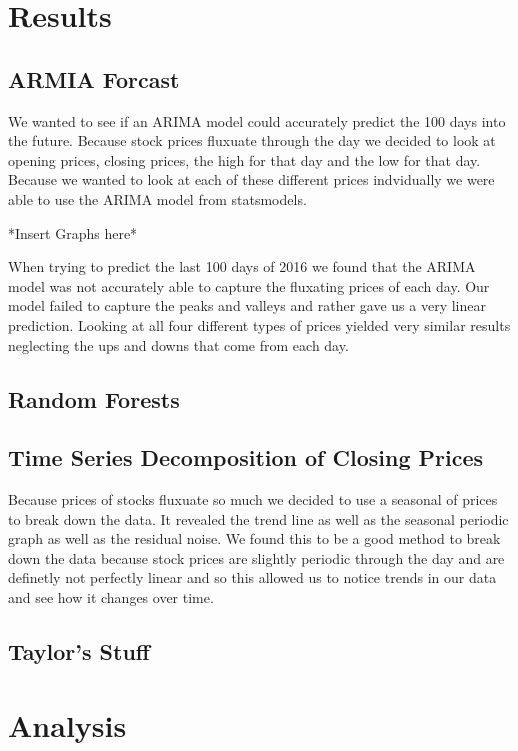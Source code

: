 \documentclass[12pt]{article}
\begin{document}
\section{Results}

\subsection{ARMIA Forcast}

We wanted to see if an ARIMA model could accurately predict the 100 days into the future. Because stock prices fluxuate through the day we decided to look at opening prices, closing prices, the high for that day and the low for that day. Because we wanted to look at each of these different prices indvidually we were able to use the ARIMA model from statsmodels.\par
*Insert Graphs here*\par
When trying to predict the last 100 days of 2016 we found that the ARIMA model was not accurately able to capture the fluxating prices of each day. Our model failed to capture the peaks and valleys and rather gave us a very linear prediction. Looking at all four different types of prices yielded very similar results neglecting the ups and downs that come from each day.

\subsection{Random Forests}

\subsection{Time Series Decomposition of Closing Prices}

Because prices of stocks fluxuate so much we decided to use a seasonal of prices to break down the data. It revealed the trend line as well as the seasonal periodic graph as well as the residual noise. We found this to be a good method to break down the data because stock prices are slightly periodic through the day and are definetly not perfectly linear and so this allowed us to notice trends in our data and see how it changes over time.

\subsection{Taylor's Stuff}

\section{Analysis}
\end{document}
